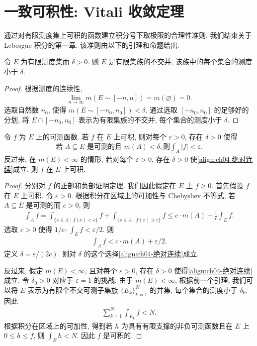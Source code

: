\documentclass[../../main.tex]{subfiles}
\begin{document}
\section{一致可积性: Vitali 收敛定理}\label{section:ch04-一致可积}

通过对有限测度集上可积的函数建立积分号下取极限的合理性准则, 我们结束关于 Lebesgue 积分的第一章. 该准则由以下的引理和命题给出.

\begin{lemma}\label{lemma:ch04-有限集族}
令 $E$ 为有限测度集而 $\delta>0$. 则 $E$ 是有限集族的不交并, 该族中的每个集合的测度小于 $\delta$.
\end{lemma}

\begin{proof}
根据测度的连续性,
\begin{align*}
\lim_{n\to\infty}m(E\sim[-n,n])=m(\varnothing)=0.
\end{align*}
选取自然数 $n_{0}$, 使得 $m(E\sim[-n_{0},n_{0}])<\delta$. 通过选取 $[-n_{0},n_{0}]$ 的足够好的分划, 将 $E\cap[-n_{0},n_{0}]$ 表示为有限集族的不交并, 每个集合的测度小于 $\delta$.
\end{proof}

\begin{proposition}\label{proposition:ch04-绝对连续积分}
令 $f$ 为 $E$ 上的可测函数. 若 $f$ 在 $E$ 上可积, 则对每个 $\varepsilon>0$, 存在 $\delta>0$ 使得
\begin{align}
\text{若 }A\subseteq E\text{ 是可测的且 }m(A)<\delta,\text{则}\int_{A}|f|<\varepsilon.\label{align:ch04-绝对连续}
\end{align}
反过来, 在 $m(E)<\infty$ 的情形, 若对每个 $\varepsilon>0$, 存在 $\delta>0$ 使\eqref{align:ch04-绝对连续}成立, 则 $f$ 在 $E$ 上可积.
\end{proposition}

\begin{proof}
分别对 $f$ 的正部和负部证明定理. 我们因此假定在 $E$ 上 $f\geqslant 0$. 首先假设 $f$ 在 $E$ 上可积. 令 $\varepsilon>0$. 根据积分在区域上的可加性与 Chebyshev 不等式, 若 $A\subseteq E$ 是可测的而 $c>0$, 则
\begin{align*}
\int_{A}f=\int_{\{x\in A\mid f(x)<c\}}f+\int_{\{x\in A\mid f(x)\geqslant c\}}f\leqslant c\cdot m(A)+\frac{1}{c}\int_{E}f.
\end{align*}
选取 $c>0$ 使得 $1/c\cdot\int_{E}f<\varepsilon/2$. 则
\begin{align*}
\int_{A}f<c\cdot m(A)+\varepsilon/2.
\end{align*}
定义 $\delta=\varepsilon/(2c)$. 则对 $\delta$ 的这个选择\eqref{align:ch04-绝对连续}成立.

反过来, 假定 $m(E)<\infty$, 且对每个 $\varepsilon>0$, 存在 $\delta>0$ 使得\eqref{align:ch04-绝对连续}成立. 令 $\delta_{0}>0$ 对应于 $\varepsilon=1$ 的挑战. 由于 $m(E)<\infty$, 根据前一个引理, 我们可以将 $E$ 表示为有限个不交可测子集族 $\{E_{k}\}_{k=1}^{N}$ 的并集, 每个集合的测度小于 $\delta_{0}$. 因此
\begin{align*}
\sum_{k=1}^{N}\int_{E_{k}}f<N.
\end{align*}
根据积分在区域上的可加性, 得到若 $h$ 为具有有限支撑的非负可测函数且在 $E$ 上 $0\leqslant h\leqslant f$, 则 $\int_{E}h<N$. 因此 $f$ 是可积的.
\end{proof}
\end{document}
